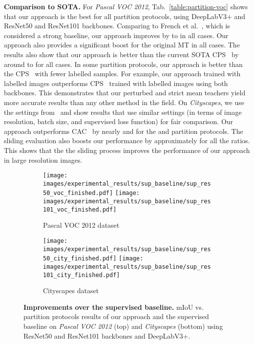 \documentclass[10pt,twocolumn,letterpaper]{article}
\begin{document}
\textbf{Comparison to SOTA.} For \textit{Pascal VOC 2012}, Tab.~\ref{table:partition-voc} shows that our approach is the best for all partition protocols, using  DeepLabV3+ and ResNet50 and ResNet101 backbones. Comparing to French et al.~\cite{french2019semi}, which is considered a strong baseline, our approach improves by  to  in all cases. Our approach also provides a significant boost for the original MT in all cases.
The results also show that our approach is better than the current SOTA CPS~\cite{chen2021semi} by around  to  for all cases. In some partition protocols, our approach is  better than the CPS~\cite{chen2021semi} with fewer labelled samples. For example, our approach trained with  labelled images outperforms CPS~\cite{chen2021semi} trained with  labelled images using both backbones. This demonstrates that our perturbed and strict mean teachers yield more accurate results than any other method in the field.
On \textit{Cityscapes}, we use the settings from~\cite{lai2021semi} and show results that use similar
settings (in terms of image resolution, batch size, and supervised loss function) for fair comparison.
Our approach outperforms CAC~\cite{lai2021semi} by nearly  and  for the  and  partition protocols. The sliding evaluation also boosts our performance by approximately  for all the ratios. This shows that the the sliding process improves the performance of our approach in large resolution images. 
\begin{figure}[t]
     \begin{subfigure}[b]{0.5\textwidth}
         \centering    
         \texttt{[image: images/experimental\_results/sup\_baseline/sup\_res50\_voc\_finished.pdf]}
         \texttt{[image: images/experimental\_results/sup\_baseline/sup\_res101\_voc\_finished.pdf]}
         \caption{Pascal VOC 2012 dataset}
\end{subfigure}
     \begin{subfigure}[b]{0.5\textwidth}
         \centering    
         \texttt{[image: images/experimental\_results/sup\_baseline/sup\_res50\_city\_finished.pdf]}
        \texttt{[image: images/experimental\_results/sup\_baseline/sup\_res101\_city\_finished.pdf]}
         \caption{Cityscapes dataset}
\end{subfigure}
\caption{\textbf{Improvements over the supervised baseline.} mIoU vs. partition protocols results of our approach and the supervised baseline on  \textit{Pascal VOC 2012} (top) and \textit{Cityscapes} (bottom) using ResNet50 and ResNet101 backbones and DeepLabV3+. 
} 
    \label{fig:supervised_baseline}

\vspace{-5pt}
\end{figure}
\end{document}
